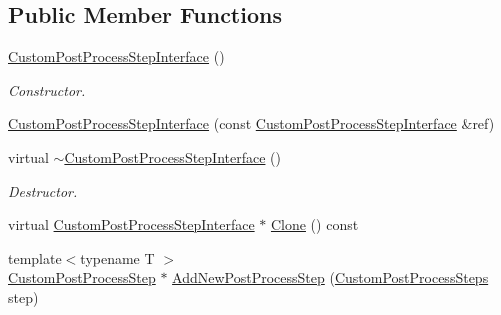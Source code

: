 \subsection*{Public Member Functions}
\begin{DoxyCompactItemize}
\item 
\mbox{\label{class_geometry_engine_1_1_custom_shading_1_1_custom_post_process_step_interface_afa53a5e09b9e76af97c22925305b833e}} 
\mbox{\hyperlink{class_geometry_engine_1_1_custom_shading_1_1_custom_post_process_step_interface_afa53a5e09b9e76af97c22925305b833e}{Custom\+Post\+Process\+Step\+Interface}} ()
\begin{DoxyCompactList}\small\item\em Constructor. \end{DoxyCompactList}\item 
\mbox{\hyperlink{class_geometry_engine_1_1_custom_shading_1_1_custom_post_process_step_interface_a0f3c8845c42763b2eab5f8620ae95545}{Custom\+Post\+Process\+Step\+Interface}} (const \mbox{\hyperlink{class_geometry_engine_1_1_custom_shading_1_1_custom_post_process_step_interface}{Custom\+Post\+Process\+Step\+Interface}} \&ref)
\item 
\mbox{\label{class_geometry_engine_1_1_custom_shading_1_1_custom_post_process_step_interface_a32c5b7e6573005e9a5d3a6ba466650f2}} 
virtual \mbox{\hyperlink{class_geometry_engine_1_1_custom_shading_1_1_custom_post_process_step_interface_a32c5b7e6573005e9a5d3a6ba466650f2}{$\sim$\+Custom\+Post\+Process\+Step\+Interface}} ()
\begin{DoxyCompactList}\small\item\em Destructor. \end{DoxyCompactList}\item 
virtual \mbox{\hyperlink{class_geometry_engine_1_1_custom_shading_1_1_custom_post_process_step_interface}{Custom\+Post\+Process\+Step\+Interface}} $\ast$ \mbox{\hyperlink{class_geometry_engine_1_1_custom_shading_1_1_custom_post_process_step_interface_a6cf76b4b01230046a84cedcac73c089e}{Clone}} () const
\item 
{\footnotesize template$<$typename T $>$ }\\\mbox{\hyperlink{class_geometry_engine_1_1_custom_shading_1_1_custom_post_process_step}{Custom\+Post\+Process\+Step}} $\ast$ \mbox{\hyperlink{class_geometry_engine_1_1_custom_shading_1_1_custom_post_process_step_interface_ad32dfc1e22d7daebc55a8e070970b1b8}{Add\+New\+Post\+Process\+Step}} (\mbox{\hyperlink{namespace_geometry_engine_1_1_custom_shading_a09e44ca81de5fe08c6d50271d680c4b1}{Custom\+Post\+Process\+Steps}} step)

\end{DoxyCompactItemize}
